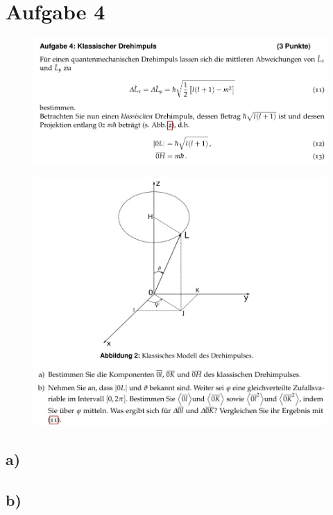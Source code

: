 \section{Aufgabe 4}

    \begin{figure}[H]
        \centering
        \includegraphics[width=\textwidth]{images/Aufgabe4a.jpg}
        \label{fig:6}
    \end{figure}

    \begin{figure}[H]
        \centering
        \includegraphics[width=\textwidth]{images/Aufgabe4b.jpg}
        \label{fig:7}
    \end{figure}

    \subsection{a)}

    \subsection{b)}









